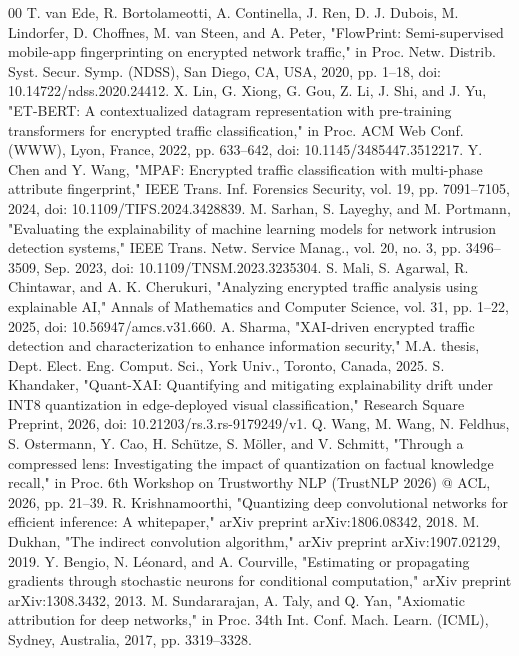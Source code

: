 \documentclass[conference]{IEEEtran}
\begin{document}
\begin{thebibliography}{00}
 T. van Ede, R. Bortolameotti, A. Continella, J. Ren, D. J. Dubois, M. Lindorfer, D. Choffnes, M. van Steen, and A. Peter, "FlowPrint: Semi-supervised mobile-app fingerprinting on encrypted network traffic," in Proc. Netw. Distrib. Syst. Secur. Symp. (NDSS), San Diego, CA, USA, 2020, pp. 1–18, doi: 10.14722/ndss.2020.24412.
 X. Lin, G. Xiong, G. Gou, Z. Li, J. Shi, and J. Yu, "ET-BERT: A contextualized datagram representation with pre-training transformers for encrypted traffic classification," in Proc. ACM Web Conf. (WWW), Lyon, France, 2022, pp. 633–642, doi: 10.1145/3485447.3512217.
 Y. Chen and Y. Wang, "MPAF: Encrypted traffic classification with multi-phase attribute fingerprint," IEEE Trans. Inf. Forensics Security, vol. 19, pp. 7091–7105, 2024, doi: 10.1109/TIFS.2024.3428839.
 M. Sarhan, S. Layeghy, and M. Portmann, "Evaluating the explainability of machine learning models for network intrusion detection systems," IEEE Trans. Netw. Service Manag., vol. 20, no. 3, pp. 3496–3509, Sep. 2023, doi: 10.1109/TNSM.2023.3235304.
 S. Mali, S. Agarwal, R. Chintawar, and A. K. Cherukuri, "Analyzing encrypted traffic analysis using explainable AI," Annals of Mathematics and Computer Science, vol. 31, pp. 1–22, 2025, doi: 10.56947/amcs.v31.660.
 A. Sharma, "XAI-driven encrypted traffic detection and characterization to enhance information security," M.A. thesis, Dept. Elect. Eng. Comput. Sci., York Univ., Toronto, Canada, 2025.
 S. Khandaker, "Quant-XAI: Quantifying and mitigating explainability drift under INT8 quantization in edge-deployed visual classification," Research Square Preprint, 2026, doi: 10.21203/rs.3.rs-9179249/v1.
 Q. Wang, M. Wang, N. Feldhus, S. Ostermann, Y. Cao, H. Schütze, S. Möller, and V. Schmitt, "Through a compressed lens: Investigating the impact of quantization on factual knowledge recall," in Proc. 6th Workshop on Trustworthy NLP (TrustNLP 2026) @ ACL, 2026, pp. 21–39.
 R. Krishnamoorthi, "Quantizing deep convolutional networks for efficient inference: A whitepaper," arXiv preprint arXiv:1806.08342, 2018.
 M. Dukhan, "The indirect convolution algorithm," arXiv preprint arXiv:1907.02129, 2019.
 Y. Bengio, N. Léonard, and A. Courville, "Estimating or propagating gradients through stochastic neurons for conditional computation," arXiv preprint arXiv:1308.3432, 2013.
 M. Sundararajan, A. Taly, and Q. Yan, "Axiomatic attribution for deep networks," in Proc. 34th Int. Conf. Mach. Learn. (ICML), Sydney, Australia, 2017, pp. 3319–3328.

\end{thebibliography}
\end{document}

